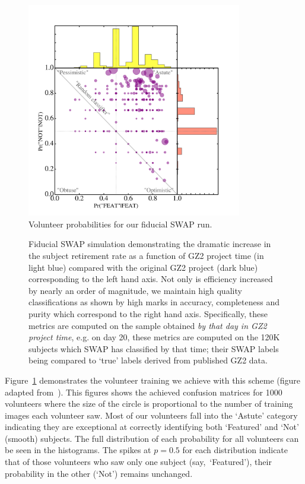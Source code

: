 \documentclass[twocolumn]{aastex6}
\newcommand{\feat}{`Featured'}
\newcommand{\notfeat}{`Not'}
\begin{document}
\begin{figure}[t!]
\includegraphics[width=3.7in]{figures/test_user_probs.png}
\caption{Volunteer probabilities for our fiducial SWAP run.  \label{fig: volunteer training}}
\end{figure}

\begin{figure}[ht!]
\caption{Fiducial SWAP simulation demonstrating the dramatic increase in the subject retirement rate as a function of GZ2 project time (in light blue) compared with the original GZ2 project (dark blue) corresponding to the left hand axis. Not only is efficiency increased by nearly an order of magnitude, we maintain high quality classifications as shown by high marks in accuracy, completeness and purity which correspond to the right hand axis.  Specifically, these metrics are computed on the sample obtained \textit{by that day in GZ2 project time}, e.g. on day 20, these metrics are computed on the 120K subjects which SWAP has classified by that time; their SWAP labels being compared to `true' labels derived from published GZ2 data. \label{fig: fiducial run}}
\end{figure}

Figure~\ref{fig: volunteer training} demonstrates the volunteer training we achieve
with this scheme (figure adapted from~\cite{Marshall2016}). 
This figures shows the achieved confusion matrices for 1000 volunteers
where the size of the circle is proportional to the number of training images each
volunteer saw. Most of our volunteers fall into the `Astute' category indicating
they are exceptional at correctly identifying both `Featured' and `Not' (smooth) subjects. 
The full distribution of each probability for all volunteers can be seen in the 
histograms. The spikes at $p=0.5$ for each distribution indicate that of those
volunteers who saw only one subject (say,~\feat), their probability in the 
other (\notfeat) remains unchanged.
\end{document}
